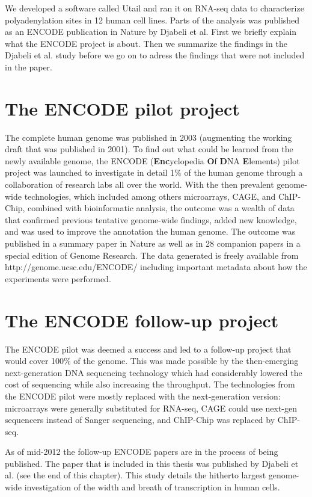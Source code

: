 %


We developed a software called Utail and ran it on RNA-seq data to characterize
polyadenylation sites in 12 human cell lines. Parts of the analysis was
published as an ENCODE publication in Nature by Djabeli et al. First we briefly
explain what the ENCODE project is about. Then we summarize the findings in the
Djabeli et al. study before we go on to adress the findings that were not
included in the paper.

\section{The ENCODE pilot project}
The complete human genome was published in 2003 (augmenting the working draft
that was published in 2001). To find out what could be learned from the newly
available genome, the ENCODE (\textbf{Enc}yclopedia \textbf{O}f \textbf{D}NA
\textbf{E}lements) pilot project was launched to investigate in detail 1\% of
the human genome through a collaboration of research labs all over the world.
With the then prevalent genome-wide technologies, which included among others
microarrays, CAGE, and ChIP-Chip, combined with bioinformatic analysis, the
outcome was a wealth of data that confirmed previous tentative genome-wide
findings, added new knowledge, and was used to improve the annotation the human
genome. The outcome was published in a summary paper in Nature
\cite{birney_identification_2007} as well as in 28 companion papers in a
special edition of Genome Research. The data generated is freely available from
http://genome.ucsc.edu/ENCODE/ including important metadata about how the
experiments were performed.

\section{The ENCODE follow-up project}
The ENCODE pilot was deemed a success and led to a follow-up project that would
cover 100\% of the genome. This was made possible by the then-emerging
next-generation DNA sequencing technology which had considerably lowered the
cost of sequencing while also increasing the throughput. The technologies from
the ENCODE pilot were mostly replaced with the next-generation version:
microarrays were generally substituted for RNA-seq, CAGE could use next-gen
sequencers instead of Sanger sequencing, and ChIP-Chip was replaced by
ChIP-seq.

As of mid-2012 the follow-up ENCODE papers are in the process of being
published. The paper that is included in this thesis was published by Djabeli
et al. (see the end of this chapter). This study details the hitherto largest
genome-wide investigation of the width and breath of transcription in human
cells.

